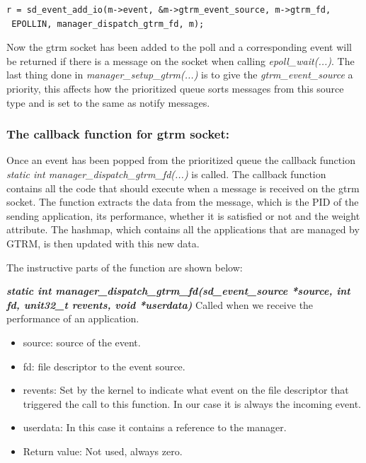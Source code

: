 \documentclass[nobiblatex]{LTHthesis}
\begin{document}
\begin{verbatim}
r = sd_event_add_io(m->event, &m->gtrm_event_source, m->gtrm_fd,
 EPOLLIN, manager_dispatch_gtrm_fd, m);
\end{verbatim}

Now the gtrm socket has been added to the poll and a corresponding event will be returned if there is a message on the socket when calling \emph{epoll\_wait(...)}. 
The last thing done in \emph{manager\_setup\_gtrm(...)} is to give the \emph{gtrm\_event\_source} a priority, this affects how the prioritized queue sorts messages from this source type and is set to the same as notify messages.



\subsubsection{The callback function for gtrm socket:}
Once an event has been popped from the prioritized queue the callback function \emph{static int manager\_dispatch\_gtrm\_fd(...)} is called. 
The callback function contains all the code that should execute when a message is received on the gtrm socket. The function extracts the data from the message, which is the PID of the sending application, its performance, whether it is satisfied or not and the weight attribute. 
The hashmap, which contains all the applications that are managed by GTRM, is then updated with this new data. 




The instructive parts of the function are shown below:

\begin{framed}
		\begin{flushleft}
			\textbf{\emph{static int manager\_dispatch\_gtrm\_fd(sd\_event\_source *source, int fd, unit32\_t revents, void *userdata)}}\newline
				Called when we receive the performance of an application.
				\begin{itemize}
				\item source: source of the event.
				\item fd: file descriptor to the event source.
				\item revents: Set by the kernel to indicate what event on the file descriptor that triggered the call to this function. In our case it is always the incoming event.
				\item userdata: In this case it contains a reference to the manager.
				\item Return value: Not used, always zero.
				\end{itemize}
		\end{flushleft}	
\end{framed}
\end{document}
